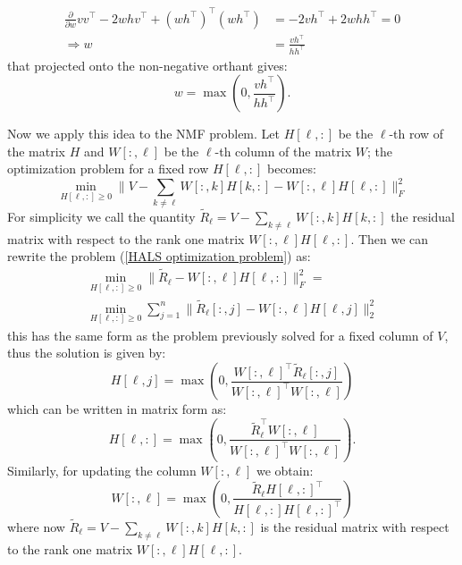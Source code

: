 \begin{align}
    \frac{\partial}{\partial w} v v^\top - 2w h v^\top + (w h^\top)^\top (w h^\top) &= -2 v h^\top + 2 w h h^\top = 0 \\
    \Rightarrow w &= \frac{v h^\top}{h h^\top}
\end{align}
that projected onto the non-negative orthant gives:
\begin{equation}
    w = \max\left(0, \frac{v h^\top}{h h^\top} \right).
\end{equation}
\par
Now we apply this idea to the NMF problem. Let $H[\ell,:]$ be the $\ell$-th row of the matrix \( H \) and $W[:,\ell]$ be the $\ell$-th column of the matrix \( W \);
the optimization problem for a fixed row $H[\ell,:]$ becomes:
\begin{equation} \label{HALS optimization problem}
    \min_{H[\ell,:] \geq 0} \| V - \sum_{k\not=\ell}W[:,k]H[k,:] - W[:,\ell]H[\ell,:] \|_F^2
\end{equation}
For simplicity we call the quantity $\tilde{R}_{\ell} = V - \sum_{k\not=\ell}W[:,k]H[k,:]$ the residual matrix with respect to the rank one matrix $W[:,\ell]H[\ell,:]$.
Then we can rewrite the problem (\ref{HALS optimization problem}) as:
\begin{align}
    \min_{H[\ell,:] \geq 0} \| \tilde{R}_{\ell} - W[:,\ell]H[\ell,:] \|_F^2 = \\
    \min_{H[\ell,:] \geq 0} \sum_{j=1}^n \| \tilde{R}_{\ell}[:,j] - W[:,\ell]H[\ell,j] \|_2^2
\end{align}
this has the same form as the problem previously solved for a fixed column of \( V \), thus the solution is given by:
\begin{equation}
    H[\ell,j] = \max\left(0, \frac{W[:,\ell]^\top\tilde{R}_{\ell}[:,j]}{W[:,\ell]^\top W[:,\ell]} \right)
\end{equation}
which can be written in matrix form as:
\begin{equation}
    H[\ell,:] = \max\left(0, \frac{\tilde{R}_{\ell}^\top W[:,\ell]}{W[:,\ell]^\top W[:,\ell]} \right).
\end{equation}
Similarly, for updating the column $W[:,\ell]$ we obtain:
\begin{equation}
    W[:,\ell] = \max\left(0, \frac{\tilde{R}_{\ell} H[\ell,:]^\top}{H[\ell,:] H[\ell,:]^\top} \right)
\end{equation}
where now $\tilde{R}_{\ell} = V - \sum_{k\not=\ell}W[:,k]H[k,:]$ is the residual matrix with respect to the rank one matrix $W[:,\ell]H[\ell,:]$.
